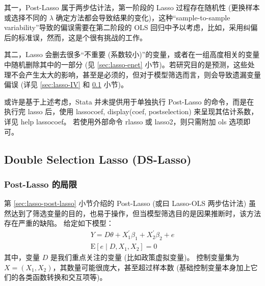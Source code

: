 其一，Post-Lasso 属于两步估计法，第一阶段的 Lasso 过程存在随机性 (更换样本或选择不同的 $\lambda$ 确定方法都会导致结果的变化)，这种“sample-to-sample
variability”导致的偏误需要在第二阶段的 OLS 回归中予以考虑，比如，采用纠偏后的标准误，然而，这是个很有挑战的工作。

其二，Lasso 会删去很多“不重要 (系数较小)”的变量，或者在一组高度相关的变量中随机删除其中的一部分 (见 \ref{sec:lasso-enet} 小节)。若研究目的是预测，这些处理不会产生太大的影响，甚至是必须的，但对于模型筛选而言，则会导致遗漏变量偏误 (详见 \ref{sec:lasso-IV} 和 \ref{sec:lasso-DSL} 小节)。

或许是基于上述考虑，Stata 并未提供用于单独执行 Post-Lasso 的命令，而是在执行完 lasso 后，使用 lassocoef, display(coef, postselection) 来呈现其估计系数，详见 help lassocoef。
若使用外部命令 rlasso 或 lasso2，则只需附加 ols 选项即可。 





\subsection{Double Selection Lasso (DS-Lasso)}\label{sec:lasso-DSL}


\subsubsection{Post-Lasso 的局限}
第 \ref{sec:lasso-post-lasso} 小节介绍的 Post-Lasso (或曰 Lasso-OLS 两步估计法) 虽然达到了筛选变量的目的，也易于操作，但当模型筛选目的是因果推断时，该方法存在严重的缺陷。
给定如下模型：
\begin{equation}\label{eq:lasso-DS-01}
\begin{aligned}%
Y =D \theta + X_1^{\prime} \beta_1 + X_2^{\prime} \beta_2 + e \\
\mathrm{E}[e \mid D, X_1, X_2] =0
\end{aligned}
\end{equation}
其中，变量 $D$ 是我们重点关注的变量 (比如政策虚拟变量)。
控制变量集为 $X = (X_1, X_2)$，其数量可能很庞大，甚至超过样本数 (基础控制变量本身加上它们的各类函数转换和交互项等)。

